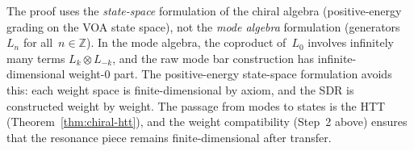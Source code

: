 \begin{remark}
\label{rem:mode-vs-state-completion}
The proof uses the \emph{state-space} formulation of the
chiral algebra (positive-energy grading on the VOA state space),
not the \emph{mode algebra} formulation (generators $L_n$ for
all~$n \in \mathbb{Z}$). In the mode algebra, the coproduct
of~$L_0$ involves infinitely many terms
$L_k \otimes L_{-k}$, and the raw mode bar construction has
infinite-dimensional weight-$0$ part. The positive-energy
state-space formulation avoids this: each weight space is
finite-dimensional by axiom, and the SDR is constructed weight by
weight. The passage from modes to states is the HTT
(Theorem~\ref{thm:chiral-htt}), and the weight compatibility
(Step~2 above) ensures that the resonance piece remains
finite-dimensional after transfer.
\end{remark}

